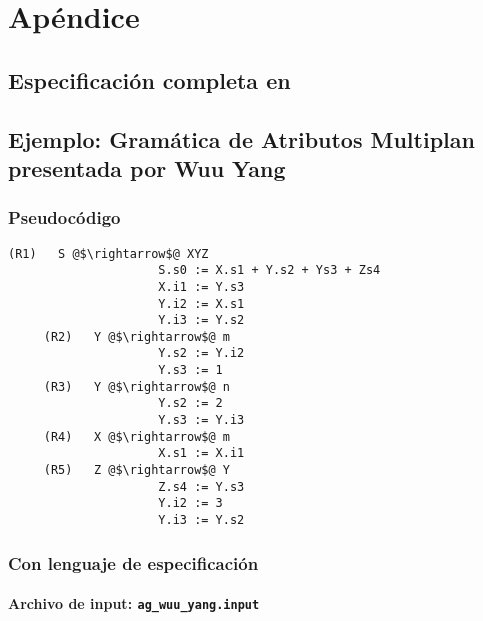 \chapter{Apéndice}
\label{chap:appendix}

\section{Especificación completa en \spirit}
\label{append:grammarspirit}



\section{Ejemplo: Gramática de Atributos Multiplan presentada por Wuu Yang}
\label{append:agwuuyang}

\subsection{Pseudocódigo}
\begin{lstlisting}[basicstyle=\scriptsize, escapeinside=@@, backgroundcolor=\color{white}]
     (R1)   S @$\rightarrow$@ XYZ      
                     S.s0 := X.s1 + Y.s2 + Ys3 + Zs4
                     X.i1 := Y.s3  
                     Y.i2 := X.s1
                     Y.i3 := Y.s2
     (R2)   Y @$\rightarrow$@ m        
                     Y.s2 := Y.i2
                     Y.s3 := 1
     (R3)   Y @$\rightarrow$@ n        
                     Y.s2 := 2
                     Y.s3 := Y.i3
     (R4)   X @$\rightarrow$@ m        
                     X.s1 := X.i1
     (R5)   Z @$\rightarrow$@ Y        
                     Z.s4 := Y.s3
                     Y.i2 := 3
                     Y.i3 := Y.s2
\end{lstlisting} 

\subsection{Con lenguaje de especificación}

\subsubsection*{Archivo de input: \texttt{ag\_wuu\_yang.input}}



